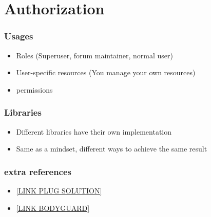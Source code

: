 \section{Authorization}

\frame{\tableofcontents[currentsection]}

\begin{frame}
    \frametitle{Usages}

    \begin{itemize}
        \item Roles (Superuser, forum maintainer, normal user)
        \item User-specific resources (You manage your own resources)
        \item permissions
    \end{itemize}
\end{frame}

\begin{frame}
    \frametitle{Libraries}

    \begin{itemize}
        \item Different libraries have their own implementation
        \item Same as a mindset, different ways to achieve the same result
    \end{itemize}
\end{frame}

\begin{frame}
    \frametitle{extra references}

    \begin{itemize}
        \item \href{https://www.theguild.nl/real-world-phoenix-user-roles-the-explicit-way/}
        {[LINK PLUG SOLUTION]}
        \item \href{https://github.com/schrockwell/bodyguard}{[LINK BODYGUARD]}
    \end{itemize}
\end{frame}



